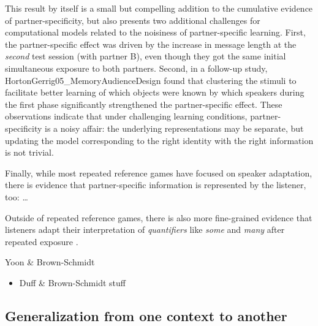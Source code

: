\documentclass[11pt, floatsintext, jou]{apa6}
\begin{document}
This result by itself is a small but compelling addition to the cumulative evidence of partner-specificity, but also presents two additional challenges for computational models related to the noisiness of partner-specific learning. First, the partner-specific effect was driven by the increase in message length at the \emph{second} test session (with partner B), even though they got the same initial simultaneous exposure to both partners. Second, in a follow-up study, {HortonGerrig05_MemoryAudienceDesign} found that clustering the stimuli to facilitate better learning of which objects were known by which speakers during the first phase significantly strengthened the partner-specific effect. These observations indicate that under challenging learning conditions, partner-specificity is a noisy affair: the underlying representations may be separate, but updating the model corresponding to the right identity with the right information is not trivial.  


Finally, while most repeated reference games have focused on speaker adaptation, there is evidence that partner-specific information is represented by the listener, too:  \dots

Outside of repeated reference games, there is also more fine-grained evidence that listeners adapt their interpretation of \emph{quantifiers} like \emph{some} and \emph{many} after repeated exposure \cite{Yildirim16_TalkerSpecificityQuantifiers}.

Yoon \& Brown-Schmidt
\begin{itemize}
\item Duff \& Brown-Schmidt stuff
\end{itemize}

\subsection{Generalization from one context to another}
\end{document}
